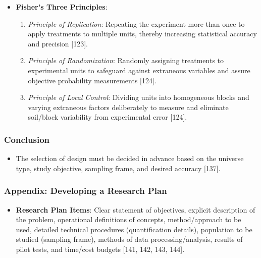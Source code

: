 \documentclass[
]{article}
\providecommand{\tightlist}{%
  \setlength{\itemsep}{0pt}\setlength{\parskip}{0pt}}
\begin{document}
\begin{itemize}
\tightlist
\item
  \textbf{Fisher's Three Principles}:

  \begin{enumerate}
  \def\labelenumi{\arabic{enumi}.}
  \tightlist
  \item
    \emph{Principle of Replication}: Repeating the experiment more than
    once to apply treatments to multiple units, thereby increasing
    statistical accuracy and precision {[}123{]}.
  \item
    \emph{Principle of Randomization}: Randomly assigning treatments to
    experimental units to safeguard against extraneous variables and
    assure objective probability measurements {[}124{]}.
  \item
    \emph{Principle of Local Control}: Dividing units into homogeneous
    blocks and varying extraneous factors deliberately to measure and
    eliminate soil/block variability from experimental error {[}124{]}.
  \end{enumerate}
\end{itemize}

\subsubsection{Conclusion}\label{conclusion-1}

\begin{itemize}
\tightlist
\item
  The selection of design must be decided in advance based on the
  universe type, study objective, sampling frame, and desired accuracy
  {[}137{]}.
\end{itemize}

\subsubsection{Appendix: Developing a Research
Plan}\label{appendix-developing-a-research-plan}

\begin{itemize}
\tightlist
\item
  \textbf{Research Plan Items}: Clear statement of objectives, explicit
  description of the problem, operational definitions of concepts,
  method/approach to be used, detailed technical procedures
  (quantification details), population to be studied (sampling frame),
  methods of data processing/analysis, results of pilot tests, and
  time/cost budgets {[}141, 142, 143, 144{]}.
\end{itemize}
\end{document}

